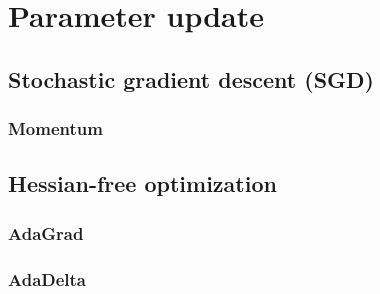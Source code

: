 \documentclass{report}
\begin{document}
\chapter{Parameter update}
\section{Stochastic gradient descent (SGD)}
\subsection{Momentum}
\section{Hessian-free optimization}
\subsection{AdaGrad}
\subsection{AdaDelta}

\section{}
\end{document}
